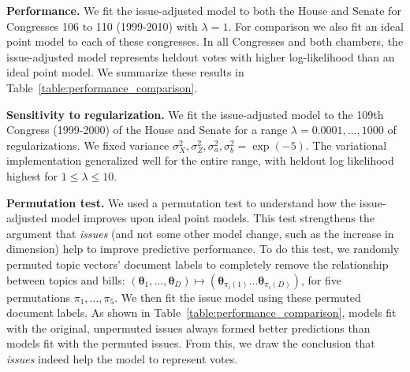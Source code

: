 \textbf{Performance.}
We fit the issue-adjusted model to both the House and Senate for
Congresses 106 to 110 (1999-2010) with $\lambda=1$. For comparison we
also fit an ideal point model to each of these congresses. In all
Congresses and both chambers, the issue-adjusted model represents
heldout votes with higher log-likelihood than an ideal point model. We
summarize these results in Table~\ref{table:performance_comparison}.

\textbf{Sensitivity to regularization.}  We fit the
issue-adjusted model to the 109th Congress (1999-2000) of the House
and Senate for a range $\lambda=0.0001, \ldots, 1000$ of
regularizations.  We fixed variance $\sigma_X^2, \sigma_Z^2,
\sigma_a^2, \sigma_b^2=\exp({-}5)$. The variational implementation
generalized well for the entire range, with heldout log likelihood
highest for $1 \le \lambda \le 10$.

\textbf{Permutation test.} We used a permutation test to understand
how the issue-adjusted model improves upon ideal point models.  This
test strengthens the argument that \emph{issues} (and not some other
model change, such as the increase in dimension) help to
improve predictive performance. To do this test, we randomly
permuted topic vectors' document labels to completely remove the
relationship between topics and bills: $(\bm \theta_1,
\ldots, \bm \theta_D) \mapsto (\bm
  \theta_{\pi_i(1)} \ldots \bm \theta_{\pi_i(D)})$, for
five permutations $\pi_1, \ldots, \pi_{5}$.  We then fit the issue
model using these permuted document labels.  As shown in
Table~\ref{table:performance_comparison}, models fit with the
original, unpermuted issues always formed better predictions than
models fit with the permuted issues. From this, we draw the conclusion
that \emph{issues} indeed help the model to represent votes.




